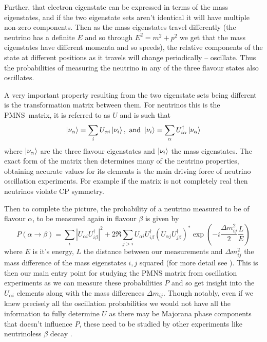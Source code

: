 \documentclass[a4paper,12pt]{article}
\begin{document}
Further, that electron eigenstate can be expressed in terms of the mass eigenstates, and if the two eigenstate sets aren't identical it will have multiple non-zero components.
Then as the mass eigenstates travel differently (the neutrino has a definite $E$ and so through $E^2 = m^2 + p^2$ we get that the mass eigenstates have different momenta and so speeds), the relative components of the state at different positions as it travels will change periodically -- oscillate.
Thus the probabilities of measuring the neutrino in any of the three flavour states also oscillates.

A very important property resulting from the two eigenstate sets being different is the transformation matrix between them.
For neutrinos this is the PMNS\footnotemark\ matrix, it is referred to as $U$ and is such that 
\begin{equation}
    \ket{\nu_\alpha} = \sum_i U_{\alpha i} \ket{\nu_i}, \text{ and }
    \ket{\nu_i} = \sum_\alpha U^\dag_{i \alpha} \ket{\nu_\alpha}
\end{equation}
where $\ket{\nu_\alpha}$ are the three flavour eigenstates and $\ket{\nu_i}$ the mass eigenstates.
The exact form of the matrix then determines many of the neutrino properties, obtaining accurate values for its elements is the main driving force of neutrino oscillation experiments.
For example if the matrix is not completely real then neutrinos violate CP symmetry\cite{zuberNeutrinoPhysics2020}.

Then to complete the picture, the probability of a neutrino measured to be of flavour $\alpha$, to be measured again in flavour $\beta$ is given by 
\begin{equation} \label{eq:nosc}
    P(\alpha \rightarrow \beta) = \sum_i |U_{\alpha i} U^\dag_{i \beta}|^2 + 2\Re \sum_{j>i} U_{\alpha i} U^\dag_{i \beta} (U_{\alpha j} U^\dag_{j \beta})^* \exp(-i\frac{\Delta m^2_{ij}}{2}\frac{L}{E})
\end{equation}
where $E$ is it's energy, $L$ the distance between our measurements and $\Delta m^2_{ij}$ the mass difference of the mass eigenstates $i, j$ squared (for more detail see \cite{zuberNeutrinoPhysics2020}).
This is then our main entry point for studying the PMNS matrix from oscillation experiments as we can measure these probabilities $P$ and so get insight into the $U_{\alpha i}$ elements along with the mass differences $\Delta m_{ij}$.
Though notably, even if we knew precisely all the oscillation probabilities we would not have all the information to fully determine $U$ as there may be Majorana phase components that doesn't influence $P$, these need to be studied by other experiments like neutrinoless $\beta$ decay \cite{degouveaManifestCPViolation2003}.
\end{document}
